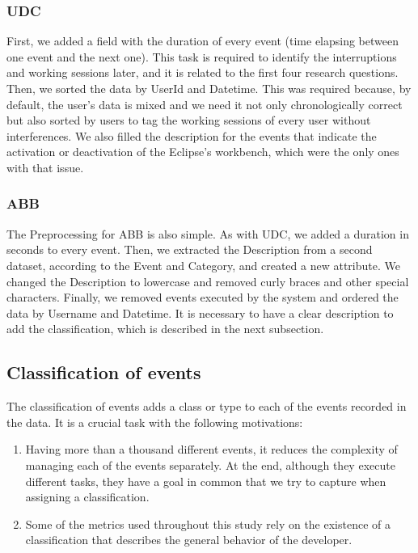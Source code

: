 \begin{changedforreviewerlong}
\subsubsection{UDC}
First, we added a field with the duration of every event (time elapsing between one event and the next one). This task is required to identify the interruptions and working sessions later, and it is related to the first four research questions. Then, we sorted the data by UserId and Datetime. This was required because, by default, the user's data is mixed and we need it not only chronologically correct but also sorted by users to tag the working sessions of every user without interferences. We also filled the description for the events that indicate the activation or deactivation of the Eclipse's workbench, which were the only ones with that issue.

\subsubsection{ABB}
The Preprocessing for ABB is also simple. As with UDC, we added a duration in seconds to every event. Then, we extracted the Description from a second dataset, according to the Event and Category, and created a new attribute. We changed the Description to lowercase and removed curly braces and other special characters. Finally, we removed events executed by the system and ordered the data by Username and Datetime. It is necessary to have a clear description to add the classification, which is described in the next subsection.



\subsection{Classification of events}
The classification of events adds a class or type to each of the events recorded in the data. It is a crucial task with the following motivations:
\begin{enumerate}
	\item Having more than a thousand different events, it reduces the complexity of managing each of the events separately. At the end, although they execute different tasks, they have a goal in common that we try to capture when assigning a classification.
	\item Some of the metrics used throughout this study rely on the existence of a classification that describes the general behavior of the developer.
\end{enumerate}


\end{changedforreviewerlong}
